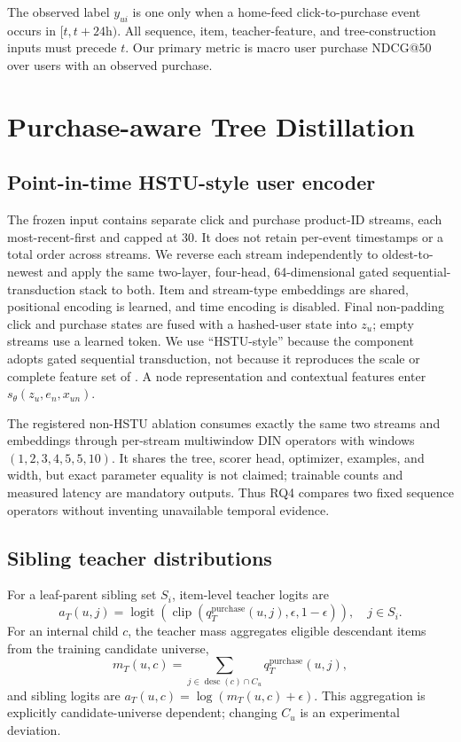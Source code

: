 \documentclass[sigconf,natbib=true]{acmart}
\begin{document}
The observed label $y_{ui}$ is one only when a home-feed click-to-purchase event occurs in $[t,t+24\mathrm{h})$. All sequence, item, teacher-feature, and tree-construction inputs must precede $t$. Our primary metric is macro user purchase NDCG@50 over users with an observed purchase.

\section{Purchase-aware Tree Distillation}
\subsection{Point-in-time HSTU-style user encoder}
The frozen input contains separate click and purchase product-ID streams, each most-recent-first and capped at 30. It does not retain per-event timestamps or a total order across streams. We reverse each stream independently to oldest-to-newest and apply the same two-layer, four-head, 64-dimensional gated sequential-transduction stack to both. Item and stream-type embeddings are shared, positional encoding is learned, and time encoding is disabled. Final non-padding click and purchase states are fused with a hashed-user state into $z_u$; empty streams use a learned token. We use ``HSTU-style'' because the component adopts gated sequential transduction, not because it reproduces the scale or complete feature set of \citet{zhai2024hstu}. A node representation and contextual features enter $s_\theta(z_u,e_n,x_{un})$.

The registered non-HSTU ablation consumes exactly the same two streams and embeddings through per-stream multiwindow DIN operators with windows $(1,2,3,4,5,5,10)$. It shares the tree, scorer head, optimizer, examples, and width, but exact parameter equality is not claimed; trainable counts and measured latency are mandatory outputs. Thus RQ4 compares two fixed sequence operators without inventing unavailable temporal evidence.

\subsection{Sibling teacher distributions}
For a leaf-parent sibling set $S_i$, item-level teacher logits are
\begin{equation}
a_T(u,j)=\operatorname{logit}\!\left(
\operatorname{clip}(q_T^{\mathrm{purchase}}(u,j),\epsilon,1-\epsilon)
\right), \quad j\in S_i.
\end{equation}
For an internal child $c$, the teacher mass aggregates eligible descendant items from the training candidate universe,
\begin{equation}
m_T(u,c)=\sum_{j\in \operatorname{desc}(c)\cap C_u}
q_T^{\mathrm{purchase}}(u,j),
\end{equation}
and sibling logits are $a_T(u,c)=\log(m_T(u,c)+\epsilon)$. This aggregation is explicitly candidate-universe dependent; changing $C_u$ is an experimental deviation.
\end{document}
